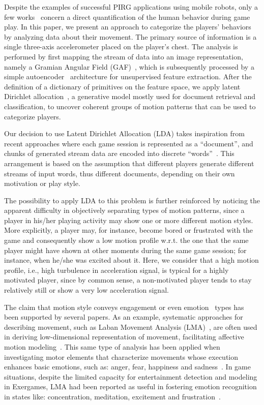 Despite the examples of successful PIRG applications using mobile robots, only a few works~\mbox{\cite{oliveira_modeling_2017,yannakakis_entertainment_2008}} concern a direct quantification of the human behavior during game play. In this paper, we present an approach to categorize the players' behaviors by analyzing data about their movement. The primary source of information is a single three-axis accelerometer placed on the player's chest. The analysis is performed by first mapping the stream of data into an image representation, namely a Gramian Angular Field (GAF)~\cite{wang_imaging_2015}, which is subsequently processed by a simple autoencoder~\cite{goodfellow_deep_2016} architecture for unsupervised feature extraction. After the definition of a dictionary of primitives on the feature space, we apply latent Dirichlet allocation~\cite{blei_latent_2003}, a generative model mostly used for document retrieval and classification, to uncover coherent groups of motion patterns that can be used to categorize players.

Our decision to use Latent Dirichlet Allocation (LDA) takes inspiration from recent approaches where each game session is represented as a ``document'', and chunks of generated stream data are encoded into discrete ``words''~\cite{smith_mining_2016}. This arrangement is based on the assumption that different players generate different streams of input words, thus different documents, depending on their own motivation or play style. 

The possibility to apply LDA to this problem is further reinforced by noticing the apparent difficulty in objectively separating types of motion patterns, since a player in his/her playing activity may show one or more different motion styles. More explicitly, a player may, for instance, become bored or frustrated with the game and consequently show a low motion profile w.r.t. the one that the same player might have shown at other moments during the same game session; for instance, when he/she was excited about it. Here, we consider that a high motion profile, i.e., high turbulence in acceleration signal, is typical for a highly motivated player, since by common sense, a non-motivated player {tends} to stay relatively still or show a very low acceleration signal.

The claim that motion style conveys engagement or even emotion~\cite{aristidou2015emotion,shafir2016emotion,tsachor2017somatic} types has been supported by several papers. As an example, systematic approaches for describing movement, such as Laban Movement Analysis (LMA)~\cite{laban1974language}, are often used in deriving low-dimensional representation of movement, facilitating affective motion modeling~\cite{burton2016laban}. This same type of analysis has been applied when investigating motor elements that characterize movements whose execution enhances basic emotions, such as: anger, fear, happiness and sadness~\cite{shafir2016emotion}. In game situations, despite the limited capacity for entertainment detection and modeling in Exergames, LMA had been reported as useful in fostering emotion recognition in states like: concentration, meditation, excitement and frustration~\cite{zacharatos2013emotion}.

